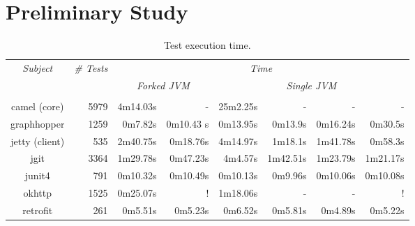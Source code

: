 \section{Preliminary Study}

\begin{table*}[t]
  \centering
  \begin{tabular}{|c|r|r|r|r|r|r|r|}
    \hline
    \multirow{2}{*}{\emph{Subject}} & \multirow{2}{*}{\emph{\# Tests}} &  \multicolumn{6}{c|}{\emph{Time}}\\
    \cline{3-8}
    & & \multicolumn{2}{c|}{\emph{Forked JVM}} & \multicolumn{4}{c|}{\emph{Single JVM}}   \\
    \cline{3-8}
    & & \multicolumn{1}{c|}{\Seq{}} & \multicolumn{1}{c|}{\ParClassSeqMeth{}} & \multicolumn{1}{c|}{\Seq{}} & \multicolumn{1}{c|}{\ParClassSeqMeth{}} & \multicolumn{1}{c|}{\SeqClassParMeth{}} & \multicolumn{1}{c|}{\ParClassParMeth{}}\\     \hline
    camel (core) & 5979 & 4m14.03s & - & 25m2.25s & - & - & - \\
    \hline
    graphhopper & 1259 & 0m7.82s & 0m10.43 s & 0m13.95s & 0m13.9s & 0m16.24s & 0m30.5s \\
    \hline
    jetty (client) & 535 & 2m40.75s & 0m18.76s & 4m14.97s & 1m18.1s & 1m41.78s & 0m58.3s \\
    \hline
    jgit & 3364 & 1m29.78s & 0m47.23s & 4m4.57s & 1m42.51s & 1m23.79s & 1m21.17s \\
    \hline
    junit4 & 791 & 0m10.32s & 0m10.49s & 0m10.13s & 0m9.96s & 0m10.06s & 0m10.08s \\
    \hline
    okhttp & 1525 & 0m25.07s & ! & 1m18.06s & - & - & ! \\
    \hline
    retrofit & 261 & 0m5.51s & 0m5.23s & 0m6.52s & 0m5.81s & 0m4.89s & 0m5.22s \\
    \hline
  \end{tabular}
  \caption{\label{table:cost}Test execution time.}
\end{table*}


